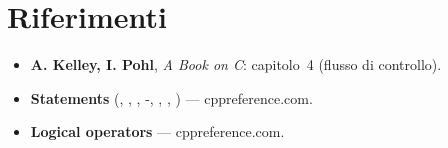\section{Riferimenti}

\begin{itemize}
  \item \textbf{A. Kelley, I. Pohl}, \textit{A Book on C}: capitolo~4
        (flusso di controllo).
  \item \textbf{Statements} (, , ,
        -, , ,
        ) --- cppreference.com. \\
  \item \textbf{Logical operators} --- cppreference.com. \\
\end{itemize}
